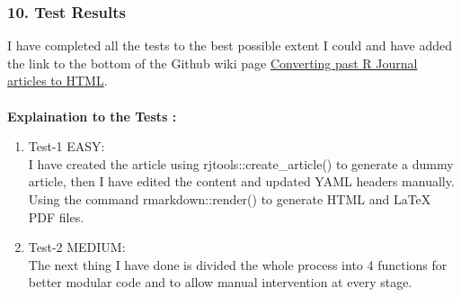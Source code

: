 \documentclass[12pt]{article}
\begin{document}
\subsubsection{10. Test Results}
I have completed all the tests to the best possible extent I could and have added the link to the bottom of the Github wiki page  \href{https://github.com/rstats-gsoc/gsoc2022/wiki/Converting-past-R-Journal-articles-to-HTML}{\color{orange}Converting past R Journal articles to HTML}.\\
\\
{\large\bfseries Explaination to the Tests :}\\
\begin{enumerate}[label = {  \color{MediumBlue} \textbf{\arabic*. }},align=left]
 \item {\color{MediumBlue} Test-1 EASY}:\\
 I have created the article using  rjtools::create\_article()  to generate a dummy article, then I have edited the content and updated YAML headers manually. Using the command rmarkdown::render() to generate HTML and LaTeX PDF files. 
 \item {\color{MediumBlue} Test-2 MEDIUM}:\\
 The next thing I have done is divided the whole process into 4 functions for better modular code and to allow manual intervention at every stage.
 

\end{enumerate}
\end{document}
